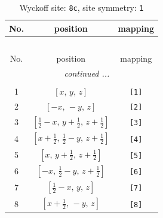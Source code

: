 \documentclass[fleqn,8pt]{jsarticle}
\begin{document}
\renewcommand{\arraystretch}{1.2}
\begin{longtable}{ccc}
\caption{Wyckoff site: {\tt 8c}, site symmetry: {\tt 1}}
 \\
 \hline \hline
No. & position & mapping \\ \hline \endfirsthead

\multicolumn{2}{l}{\tablename\ \thetable{}} \\
 \hline \hline
No. & position & mapping \\ \hline \endhead

 \hline \hline
\multicolumn{2}{r}{\footnotesize\it continued ...} \\ \endfoot

 \hline \hline
\multicolumn{2}{r}{} \\ \endlastfoot

1 & $\left[ x,\, y,\, z \right]$ & {\tt [1]} \\ \hline
2 & $\left[ - x,\, - y,\, z \right]$ & {\tt [2]} \\ \hline
3 & $\left[ \frac{1}{2} - x,\, y + \frac{1}{2},\, z + \frac{1}{2} \right]$ & {\tt [3]} \\ \hline
4 & $\left[ x + \frac{1}{2},\, \frac{1}{2} - y,\, z + \frac{1}{2} \right]$ & {\tt [4]} \\ \hline
5 & $\left[ x,\, y + \frac{1}{2},\, z + \frac{1}{2} \right]$ & {\tt [5]} \\ \hline
6 & $\left[ - x,\, \frac{1}{2} - y,\, z + \frac{1}{2} \right]$ & {\tt [6]} \\ \hline
7 & $\left[ \frac{1}{2} - x,\, y,\, z \right]$ & {\tt [7]} \\ \hline
8 & $\left[ x + \frac{1}{2},\, - y,\, z \right]$ & {\tt [8]} \\
\end{longtable}
\end{document}
